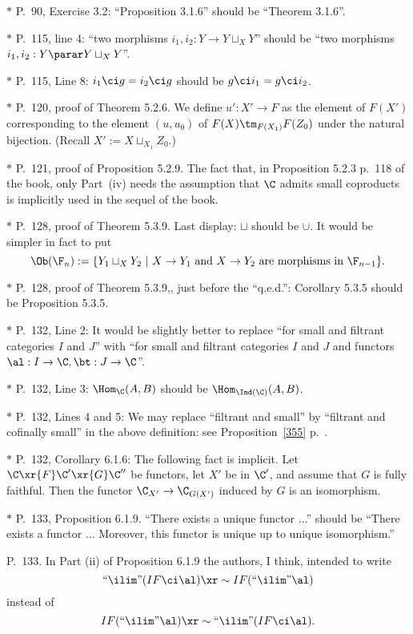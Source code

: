 \documentclass[12pt]{article}
\theoremstyle{remark}
\theoremstyle{definition}
\begin{document}
\nn$*$ P.~90, Exercise 3.2: ``Proposition 3.1.6'' should be ``Theorem 3.1.6''.

\nn$*$ P.~115, line 4: ``two morphisms $i_1,i_2:Y\to Y\sqcup_XY$'' should be ``two morphisms $i_1,i_2:Y\parar Y\sqcup_XY$''. 

\nn$*$ P.~115, Line 8: $i_1\ci g=i_2\ci g$ should be $g\ci i_1=g\ci i_2$.

\nn$*$ P.~120, proof of Theorem 5.2.6. We define $u':X'\to F$ as the element of $F(X')$ corresponding to the element $(u,u_0)$ of $F(X)\tm_{F(X_1)}F(Z_0)$ under the natural bijection. (Recall $X':=X\sqcup_{X_1}Z_0$.)

\nn$*$ P.~121, proof of Proposition 5.2.9. The fact that, in Proposition 5.2.3 p.~118 of the book, only Part~(iv) needs the assumption that $\C$ admits small coproducts is implicitly used in the sequel of the book.

\nn$*$ P.~128, proof of Theorem 5.3.9. Last display: $\sqcup$ should be $\cup$. It would be simpler in fact to put 
$$
\Ob(\F_n):=\{Y_1\sqcup_XY_2\ |\ X\to Y_1\text{ and }X\to Y_2\text{ are morphisms in }\F_{n-1}\}.
$$ 

\nn$*$ P.~128, proof of Theorem 5.3.9,, just before the ``q.e.d.'': Corollary 5.3.5 should be Proposition 5.3.5.

\nn$*$ P.~132, Line 2: It would be slightly better to replace ``for small and filtrant categories $I$ and $J$'' with ``for small and filtrant categories $I$ and $J$ and functors $\al:I\to\C,\bt:J\to\C$''.

\nn$*$ P.~132, Line 3: $\Hom_\C(A,B)$ should be $\Hom_{\Ind(\C)}(A,B)$.

\nn$*$ P.~132, Lines 4 and 5: \guillemotleft We may replace ``filtrant and small'' by ``filtrant and cofinally small'' in the above definition\guillemotright: see Proposition~\ref{355} p.~.

\nn$*$ P.~132, Corollary 6.1.6: The following fact is implicit. Let $\C\xr{F}\C'\xr{G}\C''$ be functors, let $X'$ be in $\C'$, and assume that $G$ is fully faithful. Then the functor $\C_{X'}\to\C_{G(X')}$ induced by $G$ is an isomorphism.

\nn$*$ P.~133, Proposition 6.1.9. ``There exists a unique functor ...'' should be ``There exists a functor ... Moreover, this functor is unique up to unique isomorphism.''

\begin{s} 
P.~133. In Part (ii) of Proposition 6.1.9 the authors, I think, intended to write 
$$
``\ilim"(IF\ci\al)\xr\sim IF(``\ilim"\al)
$$
instead of 
$$
IF(``\ilim"\al)\xr\sim``\ilim"(IF\ci\al). 
$$ 
\end{s}
\end{document}
